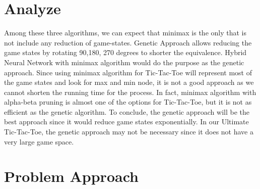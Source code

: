 \documentclass[12pt]{article}
\begin{document}
\section{Analyze}

Among these three algorithms, we can expect that minimax is the only that is not include any reduction of game-states. Genetic Approach allows reducing the game states by rotating 90,180, 270 degrees to shorter the equivalence. Hybrid Neural Network with minimax algorithm would do the purpose as the genetic approach. Since using minimax algorithm for Tic-Tac-Toe will represent most of the game states and look for max and min node, it is not a good approach as we cannot shorten the running time for the process. In fact, minimax algorithm with alpha-beta pruning is almost one of the options for Tic-Tac-Toe, but it is not as efficient as the genetic algorithm. To conclude, the genetic approach will be the best approach since it would reduce game states exponentially. In our Ultimate Tic-Tac-Toe, the genetic approach may not be necessary since it does not have a very large game space.
\section{Problem Approach}
\end{document}
